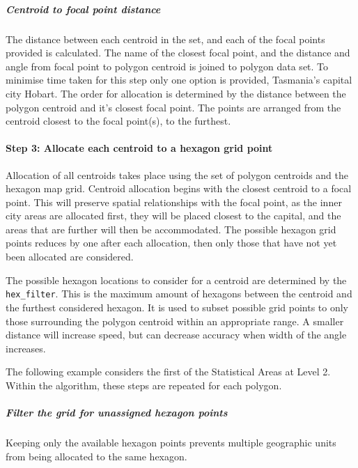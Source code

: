 \hypertarget{centroid-to-focal-point-distance}{%
\subparagraph{Centroid to focal point
distance}\label{centroid-to-focal-point-distance}}

The distance between each centroid in the set, and each of the focal
points provided is calculated. The name of the closest focal point, and
the distance and angle from focal point to polygon centroid is joined to
polygon data set. To minimise time taken for this step only one option
is provided, Tasmania's capital city Hobart. The order for allocation is
determined by the distance between the polygon centroid and it's closest
focal point. The points are arranged from the centroid closest to the
focal point(s), to the furthest.

\hypertarget{step-3-allocate-each-centroid-to-a-hexagon-grid-point}{%
\paragraph{Step 3: Allocate each centroid to a hexagon grid
point}\label{step-3-allocate-each-centroid-to-a-hexagon-grid-point}}

Allocation of all centroids takes place using the set of polygon
centroids and the hexagon map grid. Centroid allocation begins with the
closest centroid to a focal point. This will preserve spatial
relationships with the focal point, as the inner city areas are
allocated first, they will be placed closest to the capital, and the
areas that are further will then be accommodated. The possible hexagon
grid points reduces by one after each allocation, then only those that
have not yet been allocated are considered.

The possible hexagon locations to consider for a centroid are determined
by the \texttt{hex\_filter}. This is the maximum amount of hexagons
between the centroid and the furthest considered hexagon. It is used to
subset possible grid points to only those surrounding the polygon
centroid within an appropriate range. A smaller distance will increase
speed, but can decrease accuracy when width of the angle increases.

The following example considers the first of the Statistical Areas at
Level 2. Within the algorithm, these steps are repeated for each
polygon.

\hypertarget{filter-the-grid-for-unassigned-hexagon-points}{%
\subparagraph{Filter the grid for unassigned hexagon
points}\label{filter-the-grid-for-unassigned-hexagon-points}}

Keeping only the available hexagon points prevents multiple geographic
units from being allocated to the same hexagon.

